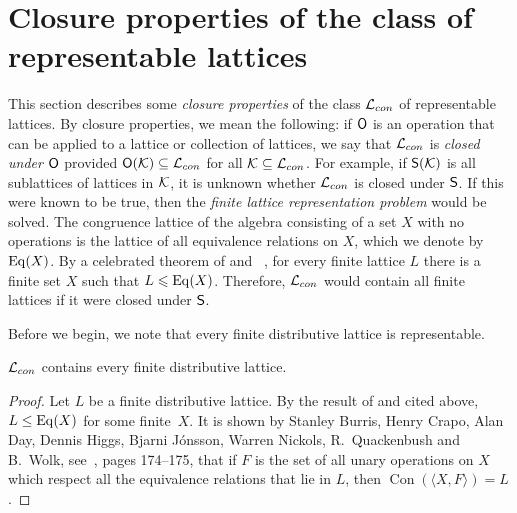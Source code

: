 
\section{Closure properties of the class of representable lattices}
\label{sec:clos-prop-class}
This section describes some
\emph{closure properties}
of the class $\mathcal{L}_{con}$ of representable lattices. 
By closure properties, we mean the following: if $\mathsf{O}$ is an operation that can
be applied to a lattice or collection of lattices, we say that $\mathcal{L}_{con}$ is
\emph{closed under $\mathsf{O}$} provided $\mathsf{O}(\mathcal{K}) \subseteq \mathcal{L}_{con}$ for all 
$\mathcal{K}\subseteq \mathcal{L}_{con}$. For example, if 
$\mathsf{S}(\mathcal{K})$ is all sublattices of lattices in $\mathcal{K}$, 
it is unknown whether $\mathcal{L}_{con}$ is closed under $\mathsf{S}$.  
If this were known to be true, then the 
\emph{finite lattice representation problem} would be solved.
The congruence lattice of the algebra consisting of a
set $X$ with no operations is the lattice of all equivalence relations on $X$,
which we denote by $\operatorname{Eq}(X)$.
By a celebrated theorem of \Pudlak and \Tuma~\cite{Pudlak:1980}, for every finite
lattice $L$ there is a finite set $X$ such that $L\leqslant \operatorname{Eq}(X)$.  Therefore, $\mathcal{L}_{con}$
would contain all finite lattices if it were closed under $\mathsf{S}$.

Before we begin, we note that every finite distributive lattice
is representable.

\begin{theorem}
$\mathcal{L}_{con}$ contains every finite distributive lattice. 
\end{theorem}

\begin{proof}
Let $L$ be a finite distributive lattice. By the result of 
\Pudlak and \Tuma cited above, $L \le \operatorname{Eq}(X)$ for some finite~$X$.
It is shown by Stanley Burris, Henry Crapo, Alan Day, 
Dennis Higgs, Bjarni J\'onsson, Warren Nickols,
R.~Quackenbush and B.~Wolk, see~\cite{Jonsson:1972}, pages 174--175, 
that if $F$ is the set of all unary operations on $X$ which respect
all the equivalence relations that lie in $L$, then
$\operatorname{Con}(\langle X,F \rangle) = L$. 
\end{proof}

